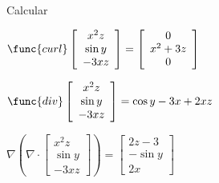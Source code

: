 \documentclass{article}
\begin{document}
Calcular

$\func{curl}\left[ 
\begin{array}{c}
x^{2}z \\ 
\sin y \\ 
-3xz%
\end{array}%
\right] =\allowbreak \left[ 
\begin{array}{c}
0 \\ 
x^{2}+3z \\ 
0%
\end{array}%
\right] $

$\func{div}\left[ 
\begin{array}{c}
x^{2}z \\ 
\sin y \\ 
-3xz%
\end{array}%
\right] =\allowbreak \cos y-3x+2xz$

$\nabla \left( \nabla \cdot \left[ 
\begin{array}{c}
x^{2}z \\ 
\sin y \\ 
-3xz%
\end{array}%
\right] \right) =\allowbreak \left[ 
\begin{array}{c}
2z-3 \\ 
-\sin y \\ 
2x%
\end{array}%
\right] $
\end{document}
